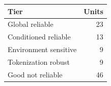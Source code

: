 \begin{tabular}{lr}
\toprule
Tier & Units \\
\midrule
Global reliable & 23 \\
Conditioned reliable & 13 \\
Environment sensitive & 9 \\
Tokenization robust & 9 \\
Good not reliable & 46 \\
\bottomrule
\end{tabular}